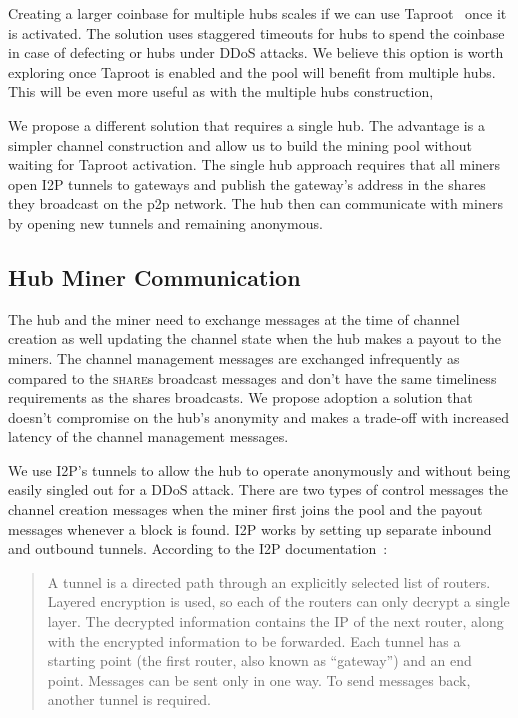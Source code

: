 \documentclass{article}
\begin{document}
Creating a larger coinbase for multiple hubs scales if we can use
Taproot~\cite{bip340,bip341, bip342} once it is activated. The
solution uses staggered timeouts for hubs to spend the coinbase in
case of defecting or hubs under DDoS attacks. We believe this option
is worth exploring once Taproot is enabled and the pool will benefit
from multiple hubs. This will be even more useful as with the multiple
hubs construction, 

We propose a different solution that requires a single hub. The
advantage is a simpler channel construction and allow us to build the
mining pool without waiting for Taproot activation. The single hub
approach requires that all miners open I2P tunnels to gateways and
publish the gateway's address in the shares they broadcast on the p2p
network. The hub then can communicate with miners by opening new
tunnels and remaining anonymous.

\subsection{Hub Miner
  Communication}\label{sec:hub-miner-communication}

The hub and the miner need to exchange messages at the time of channel
creation as well updating the channel state when the hub makes a
payout to the miners. The channel management messages are exchanged
infrequently as compared to the \textsc{share}s broadcast messages and
don't have the same timeliness requirements as the shares
broadcasts. We propose adoption a solution that doesn't compromise on
the hub's anonymity and makes a trade-off with increased latency of
the channel management messages.

We use I2P's tunnels to allow the hub to operate anonymously and
without being easily singled out for a DDoS attack. There are two
types of control messages the channel creation messages when the miner
first joins the pool and the payout messages whenever a block is
found. I2P works by setting up separate inbound and outbound
tunnels. According to the I2P documentation~\cite{i2p-tech-intro}:

\begin{quote}
  A tunnel is a directed path through an explicitly selected list of
  routers. Layered encryption is used, so each of the routers can only
  decrypt a single layer. The decrypted information contains the IP of
  the next router, along with the encrypted information to be
  forwarded. Each tunnel has a starting point (the first router, also
  known as ``gateway'') and an end point. Messages can be sent only in
  one way. To send messages back, another tunnel is required.
\end{quote}
\end{document}

